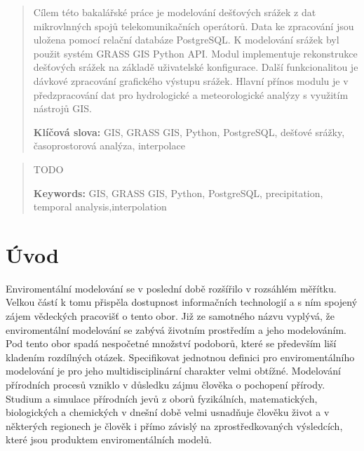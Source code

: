 \documentclass[a4paper,12pt]{article}
\author{Matěj Krejčí}
\newcommand{\klicslova}[2]{\noindent\textbf{#1: }#2}
\newcommand{\necislovana}[1]{%
\phantomsection
\addcontentsline{toc}{section}{#1}
\section*{#1}
\markboth{\uppercase{#1}}{}
}
\begin{document}
\pagestyle{empty}



\newpage


\begin{abstract}
Cílem této bakalářské práce je modelování dešťových srážek z dat mikrovlnných spojů telekomunikačních operátorů. Data ke zpracování jsou uložena pomocí relační databáze PostgreSQL.
K modelování srážek byl použit systém GRASS GIS Python API. Modul implementuje rekonstrukce dešťových srážek na základě uživatelské konfigurace. Další funkcionalitou je dávkové zpracování grafického výstupu srážek. Hlavní přínos modulu je v předzpracování dat pro hydrologické a meteorologické analýzy s využitím nástrojů GIS.
\bigskip

\klicslova{Klíčová slova}{GIS, GRASS GIS, Python, PostgreSQL, dešťové srážky, časoprostorová analýza, interpolace}

\end{abstract}

\begin{abstract}
TODO 
\bigskip

\klicslova{Keywords}{GIS, GRASS GIS, Python, PostgreSQL, precipitation, temporal analysis,interpolation}

\end{abstract}


\newpage

\newpage
\tableofcontents


\newpage
\pagestyle{fancy}

\necislovana{Úvod}

Enviromentální modelování se v poslední době rozšířilo v rozsáhlém měřítku. Velkou částí k tomu přispěla dostupnost informačních technologií a s ním spojený zájem vědeckých pracovišť o tento obor. Již ze samotného názvu vyplývá, že enviromentální modelování se zabývá životním prostředím a jeho modelováním. Pod tento obor spadá nespočetné množství podoborů, které se především liší kladením rozdílných otázek. Specifikovat jednotnou definici pro enviromentálního modelování je pro jeho multidisciplinární charakter velmi obtížné. Modelování přírodních procesů vzniklo v důsledku zájmu člověka o pochopení přírody. Studium a simulace přírodních jevů z oborů fyzikálních, matematických, biologických a chemických v dnešní době velmi usnadňuje člověku život a v některých regionech je člověk i přímo závislý na zprostředkovaných výsledcích, které jsou produktem enviromentálních modelů. 
\end{document}
